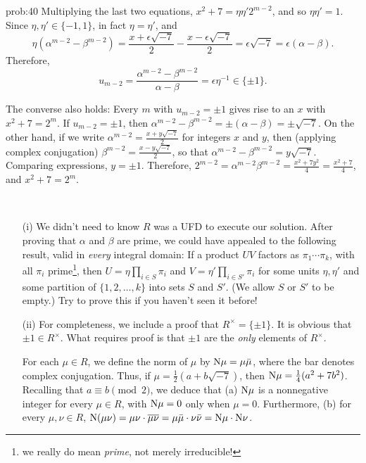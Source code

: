 \begin{sol}{prob:40}
Multiplying the last two equations, $x^2+7 = \eta\eta' 2^{m-2}$, and so $\eta\eta'=1$. Since $\eta, \eta'\in \{-1,  1\}$, in fact $\eta=\eta'$, and
\[ \eta(\alpha^{m-2}-\beta^{m-2}) = \frac{x+\epsilon \sqrt{-7}}{2} - \frac{x-\epsilon \sqrt{-7}}{2}  =  \epsilon \sqrt{-7} = \epsilon (\alpha-\beta). \]
Therefore,
\[ u_{m-2} = \frac{\alpha^{m-2}-\beta^{m-2}}{\alpha-\beta} = \epsilon \eta^{-1} \in \{\pm 1\}. \]

The converse also holds: Every $m$ with $u_{m-2}=\pm 1$ gives rise to an $x$ with $x^2+7=2^m$. If $u_{m-2} = \pm 1$, then $\alpha^{m-2}-\beta^{m-2} = \pm (\alpha-\beta) = \pm \sqrt{-7}$. On the other hand, if we write $\alpha^{m-2} = \frac{x+y\sqrt{-7}}{2}$ for integers $x$ and $y$, then (applying complex conjugation) $\beta^{m-2} = \frac{x-y\sqrt{-7}}{2}$, so that $\alpha^{m-2} - \beta^{m-2} = y\sqrt{-7}$. Comparing expressions, $y=\pm 1$. Therefore, $2^{m-2} = \alpha^{m-2} \beta^{m-2} = \frac{x^2+7y^2}{4} = \frac{x^2+7}{4}$, and $x^2+7=2^m$.



\begin{rmks}\mbox{ }
\vspace{-0.12in}
\begin{enumerate}
    \item[(i)] We didn't need to know $R$ was a UFD to execute our solution. After proving that $\alpha$ and $\beta$ are prime, we could have appealed to the following result, valid in \emph{every} integral domain: If a product $UV$ factors as $\pi_1\cdots \pi_k$, with all $\pi_i$ prime\footnote{we really do mean \emph{prime}, not merely irreducible!}, then $U = \eta\prod_{i\in S} \pi_i$ and $V = \eta'\prod_{i \in S'} \pi_i$ for some units $\eta, \eta'$ and some partition of $\{1,2,\dots,k\}$ into sets $S$ and $S'$. (We allow $S$ or $S'$ to be empty.) Try to prove this if you haven't seen it before! 
    
    \item[(ii)] For completeness, we include a proof that $R^{\times}= \{\pm 1\}$. 
    It is obvious that $\pm 1 \in R^{\times}$. What requires proof is that $\pm 1$ are the \emph{only} elements of $R^{\times}$.
    
For each $\mu \in R$, we define the \textsf{norm} of $\mu$ by $\mathrm{N}\mu = \mu\bar{\mu}$, where the bar denotes complex conjugation. Thus, if $\mu = \frac{1}{2}(a+b\sqrt{-7})$, then $\mathrm{N}\mu = \frac{1}{4}(a^2+7b^2)$. Recalling that $a\equiv b\pmod{2}$, we deduce that (a) $\mathrm{N}\mu$ is a nonnegative integer for every $\mu \in R$, with $\mathrm{N}\mu=0$ only when $\mu=0$. Furthermore, (b) for every $\mu,\nu \in R$, $\mathrm{N}(\mu\nu) = \mu\nu \cdot \overline{\mu\nu} = \mu\bar{\mu} \cdot \nu\bar{\nu} = \mathrm{N}\mu \cdot \mathrm{N}\nu$.


\end{enumerate}
\end{rmks}
\end{sol}
